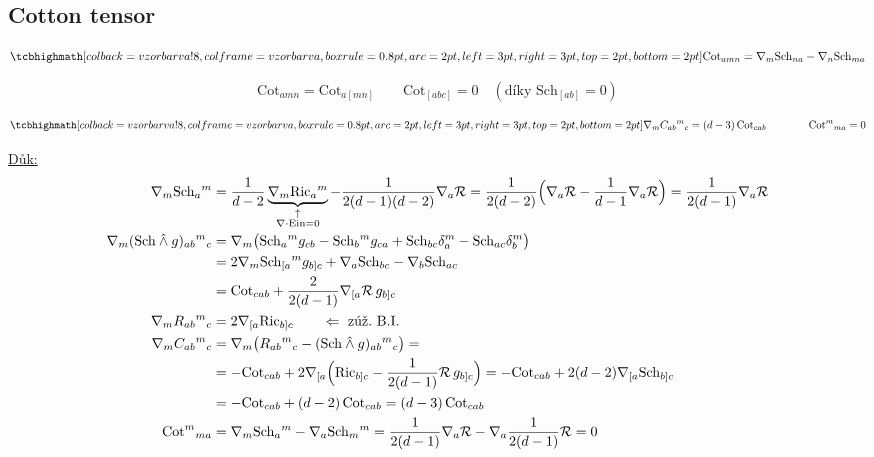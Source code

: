\subsection*{Cotton tensor}
\begin{definice}
\[
  \vzorec{\mathrm{Cot}_{amn} = \nabla_m\mathrm{Sch}_{na} - \nabla_n\mathrm{Sch}_{ma}}
\]
\end{definice}
\[
  \mathrm{Cot}_{amn} = \mathrm{Cot}_{a[mn]} \qquad \mathrm{Cot}_{[abc]} = 0 \quad (\text{díky } \mathrm{Sch}_{[ab]} = 0)
\]
\begin{veta}[Tvrzení]
\[
  \vzorec{\nabla_m C_{ab}{}^{m}{}_{c} = (d-3)\,\mathrm{Cot}_{cab}} \qquad\qquad \mathrm{Cot}^{m}{}_{ma} = 0
\]
\end{veta}
\underline{Důk:}
\begin{align*}
  \nabla_m\mathrm{Sch}_a{}^{m} &= \frac{1}{d-2}\underbrace{\nabla_m\mathrm{Ric}_a{}^{m}}_{\substack{\uparrow\\ \nabla\cdot\mathrm{Ein} = 0}} - \frac{1}{2(d-1)(d-2)}\nabla_a\mathcal{R}
  = \frac{1}{2(d-2)}\Big(\nabla_a\mathcal{R} - \frac{1}{d-1}\nabla_a\mathcal{R}\Big) = \frac{1}{2(d-1)}\nabla_a\mathcal{R} \\
  \nabla_m(\mathrm{Sch}\owedge g)_{ab}{}^{m}{}_{c} &= \nabla_m\big(\mathrm{Sch}_a{}^{m}g_{cb} - \mathrm{Sch}_b{}^{m}g_{ca} + \mathrm{Sch}_{bc}\delta^{m}_{a} - \mathrm{Sch}_{ac}\delta^{m}_{b}\big) \\
  &= 2\nabla_m\mathrm{Sch}_{[a}{}^{m}g_{b]c} + \nabla_a\mathrm{Sch}_{bc} - \nabla_b\mathrm{Sch}_{ac} \\
  &= \mathrm{Cot}_{cab} + \frac{2}{2(d-1)}\nabla_{[a}\mathcal{R}\,g_{b]c} \\
  \nabla_m R_{ab}{}^{m}{}_{c} &= 2\nabla_{[a}\mathrm{Ric}_{b]c} \qquad\Leftarrow\ \text{zúž.\ B.I.} \\
  \nabla_m C_{ab}{}^{m}{}_{c} &= \nabla_m\big(R_{ab}{}^{m}{}_{c} - (\mathrm{Sch}\owedge g)_{ab}{}^{m}{}_{c}\big) = \\
  &= -\mathrm{Cot}_{cab} + 2\nabla_{[a}\Big(\mathrm{Ric}_{b]c} - \frac{1}{2(d-1)}\mathcal{R}\,g_{b]c}\Big) = -\mathrm{Cot}_{cab} + 2(d-2)\nabla_{[a}\mathrm{Sch}_{b]c} \\
  &= -\mathrm{Cot}_{cab} + (d-2)\,\mathrm{Cot}_{cab} = (d-3)\,\mathrm{Cot}_{cab} \\
  \mathrm{Cot}^{m}{}_{ma} &= \nabla_m\mathrm{Sch}_a{}^{m} - \nabla_a\mathrm{Sch}_m{}^{m} = \frac{1}{2(d-1)}\nabla_a\mathcal{R} - \nabla_a\frac{1}{2(d-1)}\mathcal{R} = 0
\end{align*}

